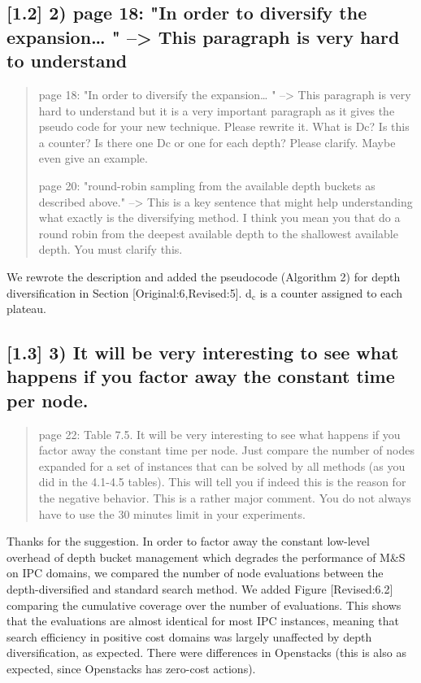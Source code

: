 \documentclass{article}
\begin{document}
\subsection{[1.2] 2) page 18: "In order to diversify the expansion\ldots{} " --> This paragraph is very hard to understand}
\label{sec:orgheadline2}

\begin{quote}
page 18: "In order to diversify the expansion\ldots{} " --> This
paragraph is very hard to understand but it is a very important
paragraph as it gives the pseudo code for your new technique. Please
rewrite it. What is Dc? Is this a counter? Is there one Dc or one for
each depth? Please clarify. Maybe even give an example.

page 20: "round-robin sampling from the available depth buckets as
described above." --> This is a key sentence that might help
understanding what exactly is the diversifying method. I think you
mean you that do a round robin from the deepest available depth to the
shallowest available depth. You must clarify this.
\end{quote}

We rewrote the description and added the pseudocode (Algorithm 2) for depth diversification
in Section [Original:6,Revised:5].
d\(_{\text{c}}\) is a counter assigned to each plateau.

\subsection{[1.3] 3) It will be very interesting to see what happens if you factor away the constant time per node.}
\label{sec:orgheadline3}

\begin{quote}
page 22: Table 7.5. It will be very interesting to see what
happens if you factor away the constant time per node. Just compare
the number of nodes expanded for a set of instances that can be solved
by all methods (as you did in the 4.1-4.5 tables). This will tell you
if indeed this is the reason for the negative behavior. This is a
rather major comment. You do not always have to use the 30 minutes
limit in your experiments.
\end{quote}

Thanks for the suggestion. In order to factor away the constant low-level overhead of depth bucket management
which degrades the performance of M\&S on IPC domains,
we compared the number of node evaluations between the depth-diversified and standard search method.
We added Figure [Revised:6.2] comparing the cumulative coverage over the number of evaluations.
This shows that the evaluations are almost identical for most IPC instances, meaning that search efficiency in positive cost domains was largely unaffected by depth diversification, as expected.
There were differences in Openstacks (this is also as expected, since Openstacks has zero-cost actions).
\end{document}
